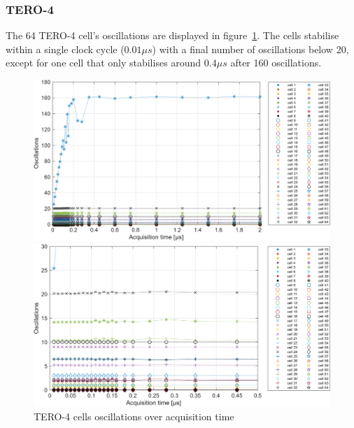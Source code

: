 \subsubsection*{TERO-4}

The 64 TERO-4 cell's oscillations are displayed in figure~\ref{fig:tero_4_oscillation_vs_time}. The cells stabilise within a single clock cycle ($0.01\mu s$) with a final number of oscillations below 20, except for one cell that only stabilises around $0.4\mu s$ after 160 oscillations.

\begin{figure}[H]
   \begin{minipage}[b]{\linewidth} 
        \centering
        \includegraphics[width=\linewidth]{images/tero_4_oscillations_vs_time.png}
   \end{minipage}
   \begin{minipage}[b]{\linewidth}   
        \centering
        \includegraphics[width=\linewidth]{images/tero_4_oscillations_vs_time_zoomed.png}
   \end{minipage}
   \caption{TERO-4 cells oscillations over acquisition time\label{fig:tero_4_oscillation_vs_time}}
\end{figure}

